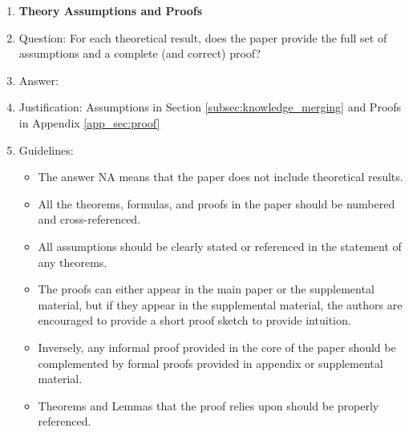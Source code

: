 \documentclass{article}
\begin{document}
\begin{enumerate}
\item {\bf Theory Assumptions and Proofs}
    \item[] Question: For each theoretical result, does the paper provide the full set of assumptions and a complete (and correct) proof?
    \item[] Answer: \answerYes{} %
    \item[] Justification: Assumptions in Section \ref{subsec:knowledge_merging} and Proofs in Appendix \ref{app_sec:proof}
    \item[] Guidelines:
    \begin{itemize}
        \item The answer NA means that the paper does not include theoretical results. 
        \item All the theorems, formulas, and proofs in the paper should be numbered and cross-referenced.
        \item All assumptions should be clearly stated or referenced in the statement of any theorems.
        \item The proofs can either appear in the main paper or the supplemental material, but if they appear in the supplemental material, the authors are encouraged to provide a short proof sketch to provide intuition. 
        \item Inversely, any informal proof provided in the core of the paper should be complemented by formal proofs provided in appendix or supplemental material.
        \item Theorems and Lemmas that the proof relies upon should be properly referenced. 
    \end{itemize}


\end{enumerate}
\end{document}
